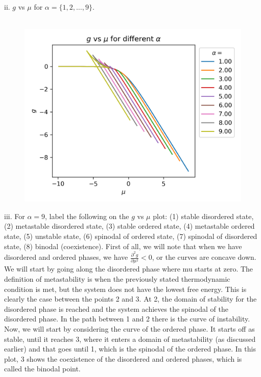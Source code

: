 \documentclass[12pt]{article}
\begin{document}
\subsubsection{}
ii. $g$ vs $\mu$ for $\alpha=\{1,2, \ldots, 9\}$.\\\\
\begin{figure}
  \centering
  \includegraphics[max width=\textwidth]{g-mu.png}
\end{figure}
iii. For $\alpha=9$, label the following on the $g$ vs $\mu$ plot: (1) stable disordered state, (2) metastable disordered state, (3) stable ordered state, (4) metastable ordered state, (5) unstable state, (6) spinodal of ordered state, (7) spinodal of disordered state, (8) binodal (coexistence).
\newpage
First of all, we will note that when we have disordered and ordered phases, we have $\frac{\partial ^2 g}{\partial \mu ^2} < 0$, or the curves are concave down. We will start by going along the disordered phase where mu starts at zero. The definition of metastability is when the previously stated thermodynamic condition is met, but the system does not have the lowest free energy. This is clearly the case between the points 2 and 3. At 2, the domain of stability for the disordered phase is reached and the system achieves the spinodal of the disordered phase. In the path between 1 and 2 there is the curve of instability. Now, we will start by considering the curve of the ordered phase. It starts off as stable, until it reaches 3, where it enters a domain of metastability (as discussed earlier) and that goes until 1, which is the spinodal of the ordered phase. In this plot, 3 shows the coexistence of the disordered and ordered phases, which is called the binodal point.
\end{document}
